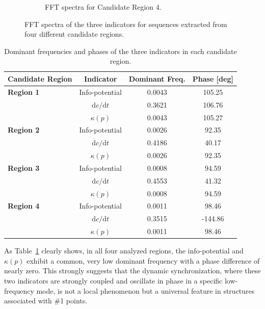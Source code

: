 \documentclass[a4paper,12pt]{article}
\begin{document}
\begin{figure}[H]
\begin{subfigure}{0.48\linewidth}
        \caption{FFT spectra for Candidate Region 4.}
        \label{fig:supp_fft_region4}
    \end{subfigure}
    \caption{FFT spectra of the three indicators for sequences extracted from four different candidate regions.}
    \label{fig:supp_fft_regions}
\end{figure}

\begin{table}[H]
    \centering
    \caption{Dominant frequencies and phases of the three indicators in each candidate region.}
    \label{tab:supp_fft_peak_results}
    \begin{tabular}{@{}lccc@{}}
        \toprule
        \textbf{Candidate Region} & \textbf{Indicator} & \textbf{Dominant Freq.} & \textbf{Phase [deg]} \\
        \midrule
        \textbf{Region 1} & Info-potential & 0.0043 & 105.25 \\
                         & $\mathrm{d}c/\mathrm{d}t$ & 0.3621 & 106.76 \\
                         & $\kappa(p)$ & 0.0043 & 105.27 \\
        \midrule
        \textbf{Region 2} & Info-potential & 0.0026 & 92.35 \\
                         & $\mathrm{d}c/\mathrm{d}t$ & 0.4186 & 40.17 \\
                         & $\kappa(p)$ & 0.0026 & 92.35 \\
        \midrule
        \textbf{Region 3} & Info-potential & 0.0008 & 94.59 \\
                         & $\mathrm{d}c/\mathrm{d}t$ & 0.4553 & 41.32 \\
                         & $\kappa(p)$ & 0.0008 & 94.59 \\
        \midrule
        \textbf{Region 4} & Info-potential & 0.0011 & 98.46 \\
                         & $\mathrm{d}c/\mathrm{d}t$ & 0.3515 & -144.86 \\
                         & $\kappa(p)$ & 0.0011 & 98.46 \\
        \bottomrule
    \end{tabular}
\end{table}

As Table~\ref{tab:supp_fft_peak_results} clearly shows, in all four analyzed regions, the info-potential and $\kappa(p)$ exhibit a common, very low dominant frequency with a phase difference of nearly zero. This strongly suggests that the dynamic synchronization, where these two indicators are strongly coupled and oscillate in phase in a specific low-frequency mode, is not a local phenomenon but a universal feature in structures associated with \#1 points.
\end{document}
